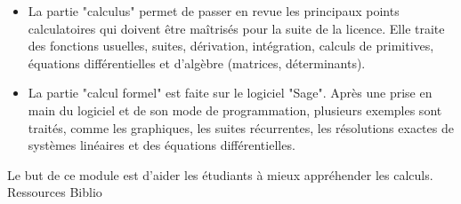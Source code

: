 \documentclass[10pt, a5paper]{report}
\begin{document}
{
\begin{itemize}
\item La partie "calculus" permet de passer en revue les principaux points calculatoires qui doivent être maîtrisés pour la suite de la licence. Elle traite des fonctions usuelles, suites, dérivation, intégration, calculs de primitives, équations différentielles et d'algèbre (matrices, déterminants).
\item La partie "calcul formel" est faite sur le logiciel "Sage". Après une prise en main du logiciel et de son mode de programmation, plusieurs exemples sont traités, comme les graphiques, les suites récurrentes, les résolutions exactes de systèmes linéaires et des équations différentielles.
\end{itemize}
}
{}
{Le but de ce module est d'aider les étudiants à mieux appréhender les calculs.} 
{Ressources} 
{Biblio}  
 
\vfill

\end{document}
